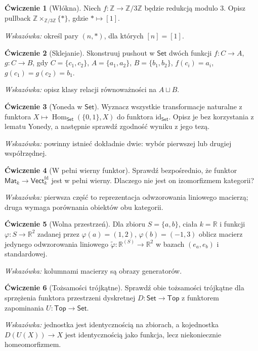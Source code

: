 \documentclass[11pt,a4paper]{article}
\numberwithin{equation}{section}
\theoremstyle{plain}
\theoremstyle{definition}
\newtheorem{cwiczenie}{Ćwiczenie}
\theoremstyle{remark}
\newcommand{\cat}[1]{\mathsf{#1}}
\newcommand{\Set}{\cat{Set}}
\newcommand{\Top}{\cat{Top}}
\newcommand{\Vect}{\cat{Vect}}
\newcommand{\id}{\mathrm{id}}
\newcommand{\Hom}{\operatorname{Hom}}
\begin{document}
\begin{cwiczenie}[Włókna]
Niech $f:\mathbb Z\to\mathbb Z/3\mathbb Z$ będzie redukcją modulo $3$. Opisz pullback $\mathbb Z\times_{\mathbb Z/3\mathbb Z}\{*\}$, gdzie $*\mapsto[1]$.

\emph{Wskazówka:} określ pary $(n,*)$, dla których $[n]=[1]$.
\end{cwiczenie}

\begin{cwiczenie}[Sklejanie]
Skonstruuj pushout w $\Set$ dwóch funkcji $f:C\to A$, $g:C\to B$, gdy $C=\{c_1,c_2\}$, $A=\{a_1,a_2\}$, $B=\{b_1,b_2\}$, $f(c_i)=a_i$, $g(c_1)=g(c_2)=b_1$.

\emph{Wskazówka:} opisz klasy relacji równoważności na $A\sqcup B$.
\end{cwiczenie}

\begin{cwiczenie}[Yoneda w $\Set$]
Wyznacz wszystkie transformacje naturalne z funktora $X\mapsto\Hom_{\Set}(\{0,1\},X)$ do funktora $\id_{\Set}$. Opisz je bez korzystania z lematu Yonedy, a następnie sprawdź zgodność wyniku z jego tezą.

\emph{Wskazówka:} powinny istnieć dokładnie dwie: wybór pierwszej lub drugiej współrzędnej.
\end{cwiczenie}

\begin{cwiczenie}[W pełni wierny funktor]
Sprawdź bezpośrednio, że funktor $\cat{Mat}_k\to\Vect_k^{\mathrm{fd}}$ jest w pełni wierny. Dlaczego nie jest on izomorfizmem kategorii?

\emph{Wskazówka:} pierwsza część to reprezentacja odwzorowania liniowego macierzą; druga wymaga porównania obiektów obu kategorii.
\end{cwiczenie}

\begin{cwiczenie}[Wolna przestrzeń]
Dla zbioru $S=\{a,b\}$, ciała $k=\mathbb R$ i funkcji $\varphi:S\to\mathbb R^2$ zadanej przez $\varphi(a)=(1,2)$, $\varphi(b)=(-1,3)$ oblicz macierz jedynego odwzorowania liniowego $\widetilde\varphi:\mathbb R^{(S)}\to\mathbb R^2$ w bazach $(e_a,e_b)$ i standardowej.

\emph{Wskazówka:} kolumnami macierzy są obrazy generatorów.
\end{cwiczenie}

\begin{cwiczenie}[Tożsamości trójkątne]
Sprawdź obie tożsamości trójkątne dla sprzężenia funktora przestrzeni dyskretnej $D:\Set\to\Top$ z funktorem zapominania $U:\Top\to\Set$.

\emph{Wskazówka:} jednostka jest identycznością na zbiorach, a kojednostka $D(U(X))\to X$ jest identycznością jako funkcja, lecz niekoniecznie homeomorfizmem.
\end{cwiczenie}
\end{document}
